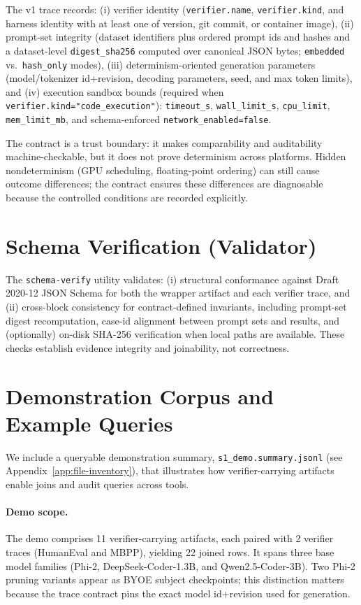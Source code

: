 \documentclass{article} %
\newcommand{\schemaverify}{\texttt{schema-verify}\xspace}
\begin{document}
The v1 trace records:
(i) verifier identity (\texttt{verifier.name}, \texttt{verifier.kind}, and harness identity with at
least one of version, git commit, or container image),
(ii) prompt-set integrity (dataset identifiers plus ordered prompt ids and hashes and a dataset-level
\texttt{digest\_sha256} computed over canonical JSON bytes; \texttt{embedded} vs.\ \texttt{hash\_only}
modes),
(iii) determinism-oriented generation parameters (model/tokenizer id+revision, decoding parameters,
seed, and max token limits),
and (iv) execution sandbox bounds (required when \texttt{verifier.kind="code\_execution"}):
\texttt{timeout\_s}, \texttt{wall\_limit\_s}, \texttt{cpu\_limit}, \texttt{mem\_limit\_mb}, and schema-enforced
\texttt{network\_enabled=false}.

The contract is a trust boundary: it makes comparability and auditability machine-checkable, but it
does not prove determinism across platforms.
Hidden nondeterminism (GPU scheduling, floating-point ordering) can still cause outcome differences;
the contract ensures these differences are diagnosable because the controlled conditions are
recorded explicitly.

\section{Schema Verification (Validator)}
The \schemaverify utility validates:
(i) structural conformance against Draft 2020-12 JSON Schema \citep{jsonschema2020_12} for both the
wrapper artifact and each
verifier trace, and
(ii) cross-block consistency for contract-defined invariants, including prompt-set digest
recomputation, case-id alignment between prompt sets and results, and (optionally) on-disk SHA-256
verification when local paths are available.
These checks establish evidence integrity and joinability, not correctness.

\section{Demonstration Corpus and Example Queries}
We include a queryable demonstration summary,
\texttt{s1\_demo.summary.jsonl} (see Appendix~\ref{app:file-inventory}),
that illustrates how verifier-carrying artifacts enable joins and audit queries across tools.

\paragraph{Demo scope.}
The demo comprises 11 verifier-carrying artifacts, each paired with 2 verifier traces (HumanEval and
MBPP), yielding 22 joined rows.
It spans three base model families (Phi-2, DeepSeek-Coder-1.3B, and Qwen2.5-Coder-3B).
Two Phi-2 pruning variants appear as BYOE subject checkpoints; this distinction matters because the
trace contract pins the exact model id+revision used for generation.
\end{document}
